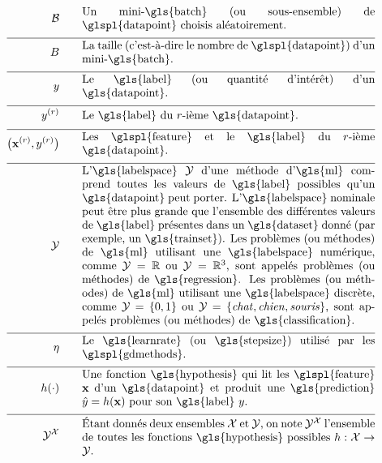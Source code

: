 \begin{align}
	\batch \quad\quad &\parbox{.75\textwidth}{Un mini-\gls{batch} (ou sous-ensemble) de \glspl{datapoint} choisis aléatoirement.}\nonumber \\[2mm] \hline \nonumber\\[-5mm]
	\batchsize \quad\quad &\parbox{.75\textwidth}{La taille (c’est-à-dire le nombre de \glspl{datapoint}) d’un mini-\gls{batch}.}\nonumber \\[2mm] \hline \nonumber\\[-5mm]
	\truelabel \quad\quad &\parbox{.75\textwidth}{Le \gls{label} (ou quantité d’intérêt) d’un \gls{datapoint}.} \nonumber \\[2mm] \hline \nonumber\\[-5mm]
	\truelabel^{(\sampleidx)} \quad\quad &\parbox{.75\textwidth}{Le \gls{label} du $\sampleidx$-ième \gls{datapoint}.} \nonumber \\[2mm] \hline \nonumber\\[-5mm]
	\big(\featurevec^{(\sampleidx)},\truelabel^{(\sampleidx)}\big)  \quad\quad &\parbox{.75\textwidth}{Les \glspl{feature} et le \gls{label} du $\sampleidx$-ième \gls{datapoint}.}\nonumber \\[2mm] \hline \nonumber\\[-5mm]
	\labelspace  \quad\quad & \parbox{.75\textwidth}{L’\gls{labelspace} $\labelspace$ d’une méthode d’\gls{ml} comprend toutes les valeurs de \gls{label} possibles qu’un \gls{datapoint} peut porter. L’\gls{labelspace} nominale peut être plus grande que l’ensemble des différentes valeurs de \gls{label} présentes dans un \gls{dataset} donné (par exemple, un \gls{trainset}). Les problèmes (ou méthodes) de \gls{ml} utilisant une \gls{labelspace} numérique, comme $\labelspace=\mathbb{R}$ ou $\labelspace=\mathbb{R}^{3}$, sont appelés problèmes (ou méthodes) de \gls{regression}. Les problèmes (ou méthodes) de \gls{ml} utilisant une \gls{labelspace} discrète, comme $\labelspace=\{0,1\}$ ou $\labelspace=\{\mbox{\emph{chat}},\mbox{\emph{chien}},\mbox{\emph{souris}}\}$, sont appelés problèmes (ou méthodes) de \gls{classification}.}  \nonumber \\[2mm] \hline \nonumber\\[-5mm]
	\lrate  \quad\quad & \parbox{.75\textwidth}{Le \gls{learnrate} (ou \gls{stepsize}) utilisé par les \glspl{gdmethods}.}  \nonumber \\[2mm] \hline \nonumber\\[-5mm]
	\hypothesis(\cdot)  \quad\quad &\parbox{.75\textwidth}{Une fonction \gls{hypothesis} qui lit les \glspl{feature} $\featurevec$ d’un \gls{datapoint} et produit une \gls{prediction} $\hat{\truelabel}=\hypothesis(\featurevec)$ pour son \gls{label} $\truelabel$.}  	 \nonumber \\[2mm] \hline \nonumber\\[-5mm]
	\labelspace^{\featurespace} \quad\quad & \parbox{.75\textwidth}{Étant donnés deux ensembles $\featurespace$ et $\labelspace$, on note $\labelspace^{\featurespace}$ l’ensemble de toutes les fonctions \gls{hypothesis} possibles $\hypothesis: \featurespace \rightarrow \labelspace$.} 	 \nonumber 
\end{align}
                  


